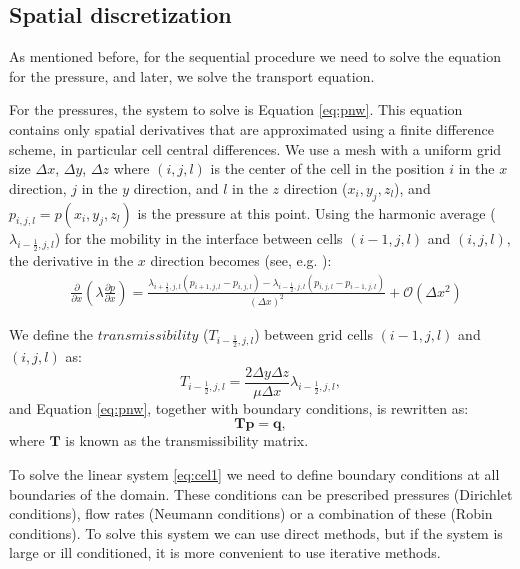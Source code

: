 \documentclass{article}
\begin{document}
\subsection*{Spatial discretization}
\hspace{0.5cm}As mentioned before, for the sequential procedure we need to solve the equation for the pressure, and later, we solve the transport equation. \par
For the pressures, the system to solve is Equation \eqref{eq:pnw}. This equation contains only spatial derivatives that are approximated using a finite difference scheme, in particular cell central differences. We use a mesh with a uniform grid size $\Delta x$, $\Delta y$, $\Delta z$ where $(i,j,l)$ is the center 
of the cell in the position $i$ in the $x$ direction, $j$ in the $y$ direction, and $l$ in the $z$ direction ($x_i,y_j,z_l$), and $p_{i,j,l}=p(x_i,y_j,z_l)$ is the pressure at this point.
Using the harmonic average ($\lambda _{i-\frac{1}{2},j,l}$) for the mobility in the interface between cells 
$(i-1,j,l)$ and $(i,j,l)$, the derivative in the $x$ direction becomes (see, e.g. \cite{Aziz79,Chen06,Jansen13, Diaz16}):
\begin{align*}
&\frac{\partial}{\partial x}\left(\lambda \frac{\partial p}{\partial x}\right) = \frac{ \lambda _{i+\frac{1}{2},j,l}(p_{i+1,j,l}-p_{i,j,l})-\lambda _{i-\frac{1}{2},j,l}(p_{i,j,l}-p_{i-1,j,l})}{\left( \Delta x\right)^2}+\mathscr{O}(\Delta x^2)
\end{align*}\par
We define the $transmissibility$ ($T_{i-\frac{1}{2},j,l}$) between grid cells $(i-1,j,l)$ and $(i,j,l)$ as:
\begin{equation}\label{eq:htrans}
 T_{i-\frac{1}{2},j,l}=\frac{2\Delta y \Delta z}{\mu\Delta x}
 \lambda_{i-\frac{1}{2},j,l},
\end{equation}  
and Equation \eqref{eq:pnw}, together with boundary conditions, is rewritten as:
 \begin{equation}\label{eq:cel1}
\mathbf{T}\mathbf{p} = \mathbf{q},
\end{equation}
where $\mathbf{T}$ is known as the transmissibility matrix. \par
To solve the linear system \eqref{eq:cel1} we need to define boundary conditions at all boundaries of the domain. These conditions can be prescribed pressures 
(Dirichlet conditions), flow rates (Neumann conditions) or a combination of these (Robin conditions). To solve this system we can use direct methods, but if the system is large or ill conditioned, it is more convenient to use iterative methods.   
\end{document}
